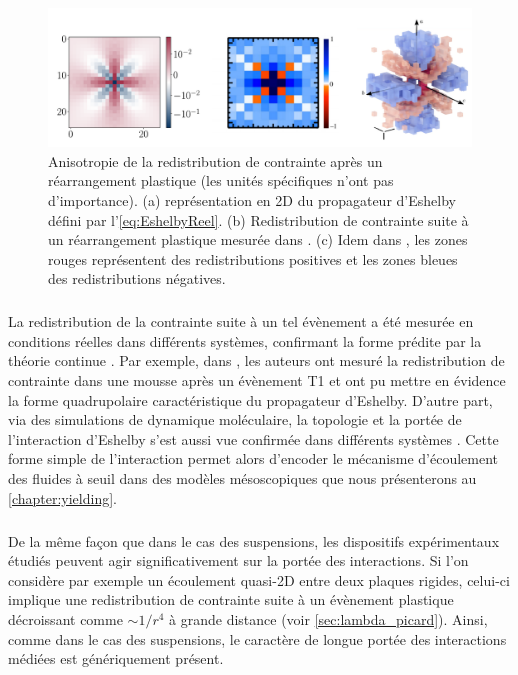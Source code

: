 \begin{figure}[h]
	\centering
	\includegraphics[width=\textwidth]{Chapitre1/Figures/InterpretationCDP/EshelbyExp.pdf}
	\caption{Anisotropie de la redistribution de contrainte après un réarrangement plastique (les unités spécifiques n'ont pas d'importance). (a) représentation en 2D du propagateur d'Eshelby défini par l'\autoref{eq:EshelbyReel}. (b) Redistribution de contrainte suite à un réarrangement plastique mesurée dans \cite{desmond_measurement_2015}. (c) Idem dans \cite{schott_multiscale_2024}, les zones rouges représentent des redistributions positives et les zones bleues des redistributions négatives.}
	\label{fig:EshelbyExp}
\end{figure}

\subparagraph{}La redistribution de la contrainte suite à un tel évènement a été mesurée en conditions réelles dans différents systèmes, confirmant la forme prédite par la théorie continue \cite{desmond_measurement_2015, schott_multiscale_2024, jensen_local_2014}. Par exemple, dans \cite{schott_multiscale_2024}, les auteurs ont mesuré la redistribution de contrainte dans une mousse après un évènement T1 et ont pu mettre en évidence la forme quadrupolaire caractéristique du propagateur d'Eshelby. D'autre part, via des simulations de dynamique moléculaire, la topologie et la portée de l'interaction d'Eshelby s'est aussi vue confirmée dans différents systèmes \cite{kabla_local_2003, maloney_amorphous_2006, tanguy_plastic_2006}. Cette forme simple de l'interaction permet alors d'encoder le mécanisme d'écoulement des fluides à seuil dans des modèles mésoscopiques que nous présenterons au \autoref{chapter:yielding}.

\subparagraph{}De la même façon que dans le cas des suspensions, les dispositifs expérimentaux étudiés peuvent agir significativement sur la portée des interactions. Si l'on considère par exemple un écoulement quasi-2D entre deux plaques rigides, celui-ci implique une redistribution de contrainte suite à un évènement plastique décroissant comme $\sim 1/r^4$ à grande distance (voir \autoref{sec:lambda_picard}). Ainsi, comme dans le cas des suspensions, le caractère de longue portée des interactions médiées est génériquement présent.


